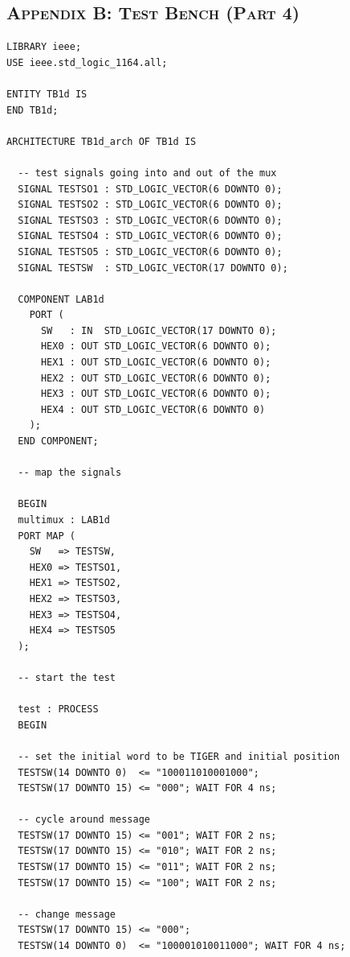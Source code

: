 \documentclass[11pt]{report}
\begin{document}
\begin{spacing}{1.5}
\chapter*{\scshape Appendix B: Test Bench (Part 4)}
\label{app:b}

\vspace{45px}
\begin{lstlisting}
LIBRARY ieee;                                               
USE ieee.std_logic_1164.all;                                

ENTITY TB1d IS
END TB1d;

ARCHITECTURE TB1d_arch OF TB1d IS
     
  -- test signals going into and out of the mux                                                                                            
  SIGNAL TESTSO1 : STD_LOGIC_VECTOR(6 DOWNTO 0);
  SIGNAL TESTSO2 : STD_LOGIC_VECTOR(6 DOWNTO 0);
  SIGNAL TESTSO3 : STD_LOGIC_VECTOR(6 DOWNTO 0);
  SIGNAL TESTSO4 : STD_LOGIC_VECTOR(6 DOWNTO 0);
  SIGNAL TESTSO5 : STD_LOGIC_VECTOR(6 DOWNTO 0);
  SIGNAL TESTSW  : STD_LOGIC_VECTOR(17 DOWNTO 0);

  COMPONENT LAB1d
    PORT (
      SW   : IN  STD_LOGIC_VECTOR(17 DOWNTO 0);
      HEX0 : OUT STD_LOGIC_VECTOR(6 DOWNTO 0);
      HEX1 : OUT STD_LOGIC_VECTOR(6 DOWNTO 0);
      HEX2 : OUT STD_LOGIC_VECTOR(6 DOWNTO 0);
      HEX3 : OUT STD_LOGIC_VECTOR(6 DOWNTO 0);
      HEX4 : OUT STD_LOGIC_VECTOR(6 DOWNTO 0) 
    );
  END COMPONENT;

  -- map the signals

  BEGIN
  multimux : LAB1d
  PORT MAP (
    SW   => TESTSW,
    HEX0 => TESTSO1,
    HEX1 => TESTSO2,
    HEX2 => TESTSO3,
    HEX3 => TESTSO4,
    HEX4 => TESTSO5
  );

  -- start the test

  test : PROCESS                                                                                   
  BEGIN                                                         
  
  -- set the initial word to be TIGER and initial position
  TESTSW(14 DOWNTO 0)  <= "100011010001000";
  TESTSW(17 DOWNTO 15) <= "000"; WAIT FOR 4 ns;

  -- cycle around message
  TESTSW(17 DOWNTO 15) <= "001"; WAIT FOR 2 ns;
  TESTSW(17 DOWNTO 15) <= "010"; WAIT FOR 2 ns;
  TESTSW(17 DOWNTO 15) <= "011"; WAIT FOR 2 ns;
  TESTSW(17 DOWNTO 15) <= "100"; WAIT FOR 2 ns;

  -- change message
  TESTSW(17 DOWNTO 15) <= "000";
  TESTSW(14 DOWNTO 0)  <= "100001010011000"; WAIT FOR 4 ns;


\end{lstlisting}
\end{spacing}
\end{document}
